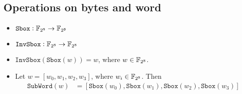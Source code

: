 
\subsection{Operations on bytes and word}
\begin{itemize}
	\item $\texttt{Sbox}:\mathbb{F}_{2^8}\to\mathbb{F}_{2^8}$
	\item $\texttt{InvSbox}:\mathbb{F}_{2^8}\to\mathbb{F}_{2^8}$
	\item $\texttt{InvSbox}(\texttt{Sbox}(w))=w$, where $w\in\mathbb{F}_{2^8}$.
\end{itemize}
\begin{itemize}
	\item Let $w=[w_0,w_1,w_2,w_3]$, where $w_i\in\mathbb{F}_{2^8}$. Then \begin{align*}
		\texttt{SubWord}(w)&=[\texttt{Sbox}(w_0),\texttt{Sbox}(w_1),\texttt{Sbox}(w_2),\texttt{Sbox}(w_3)]
	\end{align*}
\end{itemize}